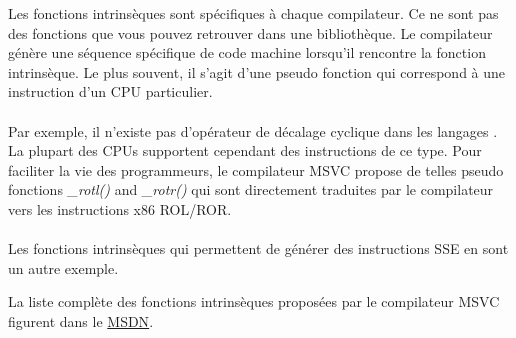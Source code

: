﻿
\label{sec:compiler_intrinsic}


Les fonctions intrinsèques sont spécifiques à chaque compilateur. Ce ne sont pas des fonctions que
vous pouvez retrouver dans une bibliothèque.
Le compilateur génère une séquence spécifique de code machine lorsqu'il rencontre la fonction
intrinsèque. Le plus souvent, il s'agit d'une pseudo fonction qui correspond à une instruction d'un
\ac{CPU} particulier.\\
\\
Par exemple, il n'existe pas d'opérateur de décalage cyclique dans les langages \CCpp. La plupart
des \ac{CPU}s supportent cependant des instructions de ce type.
Pour faciliter la vie des programmeurs, le compilateur MSVC propose de telles pseudo fonctions
\emph{\_rotl()} and \emph{\_rotr()}\FNMSDNROTxURL{}
qui sont directement traduites par le compilateur vers les instructions x86 ROL/ROR. \\
\\
Les fonctions intrinsèques qui permettent de générer des instructions SSE en sont un autre exemple.

La liste complète des fonctions intrinsèques proposées par le compilateur MSVC figurent dans le
\href{http://msdn.microsoft.com/en-us/library/26td21ds.aspx}{MSDN}.

